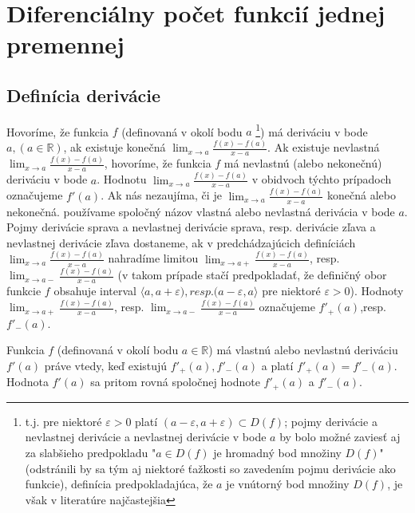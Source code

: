 \chapter{Diferenciálny počet funkcií jednej premennej}%

\section{Definícia derivácie}
Hovoríme, že funkcia $f$ (definovaná v okolí bodu $a$ \footnote{t.j. pre niektoré $\varepsilon>0$ platí $(a-\varepsilon,a+\varepsilon) \subset D(f)$; pojmy derivácie a nevlastnej derivácie a nevlastnej derivácie v bode $a$ by bolo možné zaviesť aj za slabšieho predpokladu "$a \in D(f)$ je hromadný bod množiny $D(f)$" (odstránili by sa tým aj niektoré ťažkosti so zavedením pojmu derivácie ako funkcie), definícia predpokladajúca, že $a$ je vnútorný bod množiny $D(f)$, je však v literatúre najčastejšia}) má deriváciu v bode $a,(a \in \mathbb{R})$, ak existuje konečná $\lim_{x \rightarrow a}\frac{f(x)-f(a)}{x-a}$. Ak existuje nevlastná $\lim_{x \rightarrow a}\frac{f(x)-f(a)}{x-a}$, hovoríme, že funkcia $f$ má nevlastnú (alebo nekonečnú) deriváciu v bode $a$. Hodnotu $\lim_{x \rightarrow a}\frac{f(x)-f(a)}{x-a}$ v obidvoch týchto prípadoch označujeme $f'(a)$. Ak nás nezaujíma, či je $\lim_{x \rightarrow a}\frac{f(x)-f(a)}{x-a}$ konečná alebo nekonečná. používame spoločný názov vlastná alebo nevlastná derivácia v bode $a$.
Pojmy derivácie sprava a nevlastnej derivácie sprava, resp. derivácie zľava a nevlastnej derivácie zľava dostaneme, ak v predchádzajúcich definíciách $\lim_{x \rightarrow a}\frac{f(x)-f(a)}{x-a}$ nahradíme limitou $\lim_{x \rightarrow a+}\frac{f(x)-f(a)}{x-a}$, resp. $\lim_{x \rightarrow a-}\frac{f(x)-f(a)}{x-a}$ (v takom prípade stačí predpokladať, že definičný obor funkcie $f$ obsahuje interval $\langle a,a+\varepsilon), resp. (a-\varepsilon,a\rangle$ pre niektoré $\varepsilon>0$). Hodnoty $\lim_{x \rightarrow a+}\frac{f(x)-f(a)}{x-a}$, resp. $\lim_{x \rightarrow a-}\frac{f(x)-f(a)}{x-a}$ označujeme $f'_+(a)$,resp. $f'_-(a)$.

\begin{veta}
Funkcia $f$ (definovaná v okolí bodu $a \in \mathbb{R}$) má vlastnú alebo nevlastnú deriváciu $f'(a)$ práve vtedy, keď existujú $f'_+(a),f'_-(a)$ a platí $f'_+(a)=f'_-(a)$. Hodnota $f'(a)$ sa pritom rovná spoločnej hodnote $f'_+(a)$ a $f'_-(a)$.
\end{veta}

